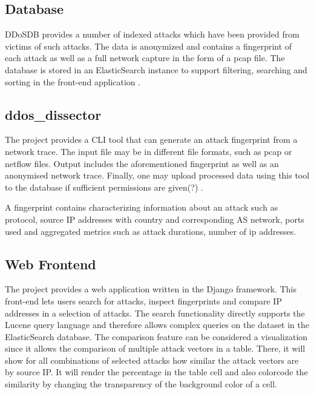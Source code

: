 \subsection{Database}
    
DDoSDB provides a number of indexed attacks which have been provided from victims of such attacks. The data is anonymized and contains a fingerprint of each attack as well as a full network capture in the form of a pcap file. \cite{ddos_dissector}
The database is stored in an ElasticSearch instance to support filtering, searching and sorting in the front-end application \cite{ddosdb-help}.

\subsection{ddos\_dissector}
    
The project provides a CLI tool that can generate an attack fingerprint from a network trace. The input file may be in different file formats, such as pcap or netflow files.
Output includes the aforementioned fingerprint as well as an anonymised network trace. Finally, one may upload processed data using this tool to the database if sufficient permissions are given(?) \cite{ddos_dissector}.

A fingerprint contains characterizing information about an attack such as protocol, source IP addresses with country and corresponding AS network, ports used and aggregated metrics such as attack durations, number of ip addresses\cite{ddosdb}.

\subsection{Web Frontend}
The project provides a web application written in the Django framework. This front-end lets users search for attacks, inspect fingerprints and compare IP addresses in a selection of attacks.
The search functionality directly supports the Lucene query language and therefore allows complex queries on the dataset in the ElasticSearch database.
The comparison feature can be considered a visualization since it allows the comparison of multiple attack vectors in a table. There, it will show for all combinations of selected attacks how similar the attack vectors are by source IP. It will render the percentage in the table cell and also colorcode the similarity by changing the transparency of the background color of a cell\cite{ddosdb}.

